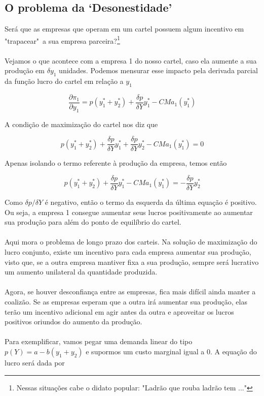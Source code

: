 \documentclass[a4paper,11pt,oneside]{book}
\theoremstyle{definition}
\theoremstyle{break}
\begin{document}
\subsection{O problema da `Desonestidade'}

Será que as empresas que operam em um cartel possuem algum incentivo em "trapacear"\ a sua empresa parceira?\footnote{Nessas situações cabe o didato popular: "Ladrão que rouba ladrão tem ..."}
\\~\\
Vejamos o que acontece com a empresa 1 do nosso cartel, caso ela aumente a sua produção em $\delta y_1$ unidades. Podemos mensurar esse impacto pela derivada parcial da função lucro do cartel em relação a $y_1$

$$ \frac{\partial \pi_1}{\partial y_1} = p(y_1^* + y_2^*) + \frac{\delta p}{\delta Y}y_1^* - CMa_1(y_1^*) $$ 

A condição de maximização do cartel nos diz que

$$ p(y_1^* + y_2^*) + \frac{\delta p}{\delta Y}y_1^* + \frac{\delta p}{\delta Y}y_2^* - CMa_1(y_1^*) = 0 $$ 

Apenas isolando o termo referente à produção da empresa, temos então

$$ p(y_1^* + y_2^*) + \frac{\delta p}{\delta Y}y_1^* - CMa_1(y_1^*) = - \frac{\delta p}{\delta Y}y_2^* $$ 

Como $\delta p / \delta Y$ é negativo, então o termo da esquerda da última equação é positivo. Ou seja, a empresa 1 consegue aumentar seus lucros positivamente ao aumentar sua produção para além do ponto de equilíbrio do cartel.
\\~\\
Aqui mora o problema de longo prazo dos carteis. Na solução de maximização do lucro conjunto, existe um incentivo para cada empresa aumentar sua produção, visto que, se a outra empresa mantiver fixa a sua produção, sempre será lucrativo um aumento unilateral da quantidade produzida.
\\~\\
Agora, se houver desconfiança entre as empresas, fica mais difícil ainda manter a coalizão. Se as empresas esperam que a outra irá aumentar sua produção, elas terão um incentivo adicional em agir antes da outra e aproveitar os lucros positivos oriundos do aumento da produção.
\\~\\
Para exemplificar, vamos pegar uma demanda linear do tipo $p(Y) = a - b(y_1 + y_2)$ e supormos um custo marginal igual a $0$. A equação do lucro será dada por 
\end{document}
